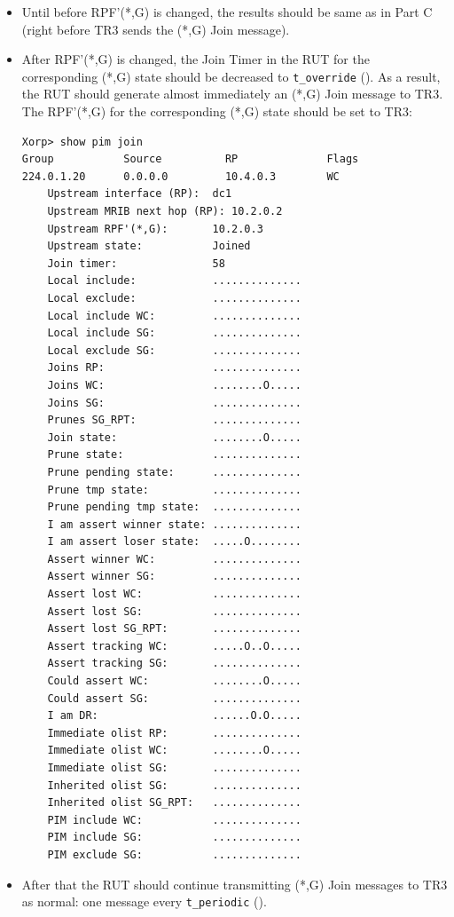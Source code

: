 \documentclass[11pt]{report}
\begin{document}
\begin{itemize}

  \item Until before RPF'(*,G) is changed, the results should
  be same as in Part C (right before TR3 sends the (*,G) Join message).

  \item After RPF'(*,G) is changed,
  the Join Timer in the RUT for the corresponding (*,G) state
  should be decreased to \verb=t_override= ({\PimsmTOverride}). As a result,
  the RUT should generate almost immediately an (*,G) Join message to TR3.
  The RPF'(*,G) for the corresponding (*,G) state should be set to TR3:

\begin{verbatim}
Xorp> show pim join
Group           Source          RP              Flags
224.0.1.20      0.0.0.0         10.4.0.3        WC   
    Upstream interface (RP):  dc1
    Upstream MRIB next hop (RP): 10.2.0.2
    Upstream RPF'(*,G):       10.2.0.3
    Upstream state:           Joined 
    Join timer:               58
    Local include:            ..............
    Local exclude:            ..............
    Local include WC:         ..............
    Local include SG:         ..............
    Local exclude SG:         ..............
    Joins RP:                 ..............
    Joins WC:                 ........O.....
    Joins SG:                 ..............
    Prunes SG_RPT:            ..............
    Join state:               ........O.....
    Prune state:              ..............
    Prune pending state:      ..............
    Prune tmp state:          ..............
    Prune pending tmp state:  ..............
    I am assert winner state: ..............
    I am assert loser state:  .....O........
    Assert winner WC:         ..............
    Assert winner SG:         ..............
    Assert lost WC:           ..............
    Assert lost SG:           ..............
    Assert lost SG_RPT:       ..............
    Assert tracking WC:       .....O..O.....
    Assert tracking SG:       ..............
    Could assert WC:          ........O.....
    Could assert SG:          ..............
    I am DR:                  ......O.O.....
    Immediate olist RP:       ..............
    Immediate olist WC:       ........O.....
    Immediate olist SG:       ..............
    Inherited olist SG:       ..............
    Inherited olist SG_RPT:   ..............
    PIM include WC:           ..............
    PIM include SG:           ..............
    PIM exclude SG:           ..............
\end{verbatim}

  \item After that the RUT should continue transmitting 
  (*,G) Join messages to TR3 as normal: one message every \verb=t_periodic=
  ({\PimsmTPeriodic}).

\end{itemize}
\end{document}
